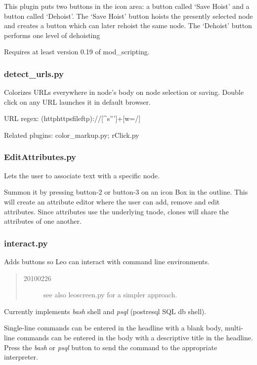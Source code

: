 \documentclass[a4paper,10pt,english]{sphinxmanual}
\begin{document}
This plugin puts two buttons in the icon area: a button called `Save Hoist' and
a button called `Dehoist'. The `Save Hoist' button hoists the presently selected
node and creates a button which can later rehoist the same node. The `Dehoist'
button performs one level of dehoisting

Requires at least version 0.19 of mod\_scripting.


\subsubsection{detect\_urls.py}
\label{plugins:detect-urls-py}
Colorizes URLs everywhere in node's body on node selection or saving. Double
click on any URL launches it in default browser.

URL regex:  (http\textbar{}https\textbar{}file\textbar{}ftp)://{[}\textasciicircum{}s'''{]}+{[}w=/{]}

Related plugins:  color\_markup.py; rClick.py


\subsubsection{EditAttributes.py}
\label{plugins:editattributes-py}
Lets the user to associate text with a specific node.

Summon it by pressing button-2 or button-3 on an icon Box in the outline. This
will create an attribute editor where the user can add, remove and edit
attributes. Since attributes use the underlying tnode, clones will share the
attributes of one another.


\subsubsection{interact.py}
\label{plugins:interact-py}
Adds buttons so Leo can interact with command line environments.
\begin{quote}\begin{description}
\item[{20100226}] \leavevmode
see also leoscreen.py for a simpler approach.

\end{description}\end{quote}

Currently implements \emph{bash} shell and \emph{psql} (postresql SQL db shell).

Single-line commands can be entered in the headline with a blank body,
multi-line commands can be entered in the body with a descriptive
title in the headline.  Press the \emph{bash} or \emph{psql} button to send
the command to the appropriate interpreter.
\end{document}
